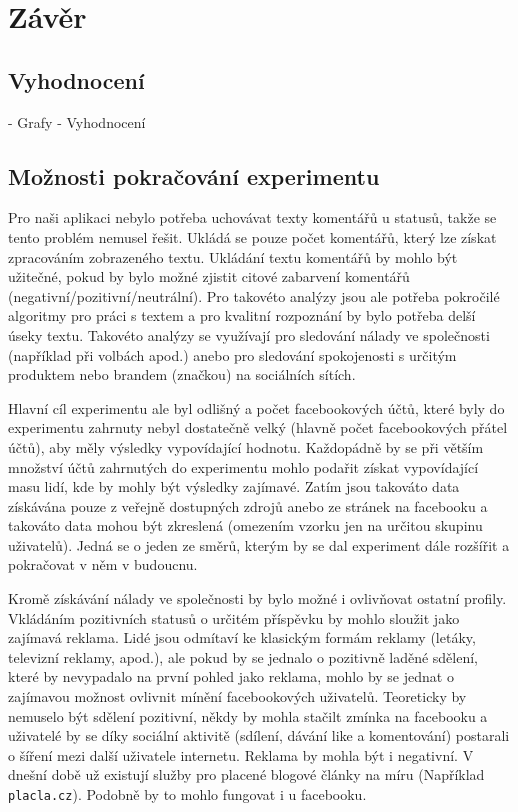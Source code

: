 \documentclass[thesis=M,czech]{FITthesis}[2013/05/10]
\begin{document}
\chapter{Z{\' a}v{\v e}r}


\section{Vyhodnocení}
- Grafy
- Vyhodnocení


\section{Možnosti pokračování experimentu}

Pro naši aplikaci nebylo potřeba uchovávat texty komentářů u statusů, takže se tento problém nemusel řešit. Ukládá se pouze počet komentářů, který lze získat zpracováním zobrazeného textu. Ukládání textu komentářů by mohlo být užitečné, pokud by bylo možné zjistit citové zabarvení komentářů (negativní/pozitivní/neutrální). Pro takovéto analýzy jsou ale potřeba pokročilé algoritmy pro práci s textem a pro kvalitní rozpoznání by bylo potřeba delší úseky textu. Takovéto analýzy se využívají pro sledování nálady ve společnosti (například při volbách apod.) anebo pro sledování spokojenosti s určitým produktem nebo brandem (značkou) na sociálních sítích. 

Hlavní cíl experimentu ale byl odlišný a počet facebookových účtů, které byly do experimentu zahrnuty nebyl dostatečně velký (hlavně počet facebookových přátel účtů), aby měly výsledky vypovídající hodnotu. Každopádně by se při větším množství účtů zahrnutých do experimentu mohlo podařit získat vypovídající masu lidí, kde by mohly být výsledky zajímavé. Zatím jsou takováto data získávána pouze z veřejně dostupných zdrojů anebo ze stránek na facebooku a takováto data mohou být zkreslená (omezením vzorku jen na určitou skupinu uživatelů). Jedná se o jeden ze směrů, kterým by se dal experiment dále rozšířit a pokračovat v něm v budoucnu.

Kromě získávání nálady ve společnosti by bylo možné i ovlivňovat ostatní profily. Vkládáním pozitivních statusů o určitém příspěvku by mohlo sloužit jako zajímavá reklama. Lidé jsou odmítaví ke klasickým formám reklamy (letáky, televizní reklamy, apod.), ale pokud by se jednalo o pozitivně laděné sdělení, které by nevypadalo na první pohled jako reklama, mohlo by se jednat o zajímavou možnost ovlivnit mínění facebookových uživatelů. Teoreticky by nemuselo být sdělení pozitivní, někdy by mohla stačilt zmínka na facebooku a uživatelé by se díky sociální aktivitě (sdílení, dávání like a komentování) postarali o šíření mezi další uživatele internetu. Reklama by mohla být i negativní. V dnešní době už existují služby pro placené blogové články na míru (Například \verb|placla.cz|). Podobně by to mohlo fungovat i u facebooku.
\end{document}
